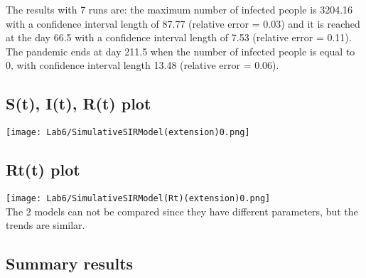 \documentclass[twocolumn,letterpaper]{report}
\begin{document}
{				The results with 7 runs are: the maximum number of infected people is 3204.16 with a confidence interval length of 87.77 (relative error = 0.03) and it is reached at the day 66.5 with a confidence interval length of 7.53 (relative error = 0.11). The pandemic ends at day 211.5 when the number of infected people is equal to 0, with confidence interval length 13.48 (relative error = 0.06).
				
			\subsection{S(t), I(t), R(t) plot}
			\texttt{[image: Lab6/SimulativeSIRModel(extension)0.png]} \\
			
			\subsection{Rt(t) plot}
			 \texttt{[image: Lab6/SimulativeSIRModel(Rt)(extension)0.png]} \\
			The 2 models can not be compared since they have different parameters, but the trends are similar.
			
		\newpage
		\subsection{Summary results}
		
}
\end{document}
